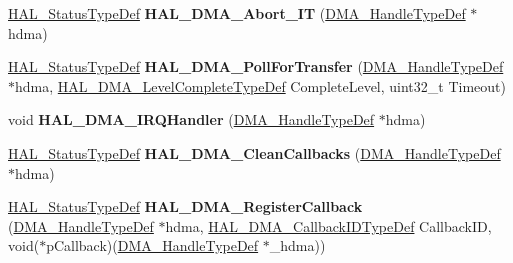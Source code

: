 \begin{DoxyCompactItemize}
\mbox{\label{group___d_m_a___exported___functions___group2_ga6677d7e614747341a58ffd7a048fd390}} 
\mbox{\hyperlink{stm32f4xx__hal__def_8h_a63c0679d1cb8b8c684fbb0632743478f}{H\+A\+L\+\_\+\+Status\+Type\+Def}} {\bfseries H\+A\+L\+\_\+\+D\+M\+A\+\_\+\+Abort\+\_\+\+IT} (\mbox{\hyperlink{group___d_m_a___exported___types_ga41b754a906b86bce54dc79938970138b}{D\+M\+A\+\_\+\+Handle\+Type\+Def}} $\ast$hdma)
\item 
\mbox{\label{group___d_m_a___exported___functions___group2_ga976a30472df973e3ad983f21289c9b5d}} 
\mbox{\hyperlink{stm32f4xx__hal__def_8h_a63c0679d1cb8b8c684fbb0632743478f}{H\+A\+L\+\_\+\+Status\+Type\+Def}} {\bfseries H\+A\+L\+\_\+\+D\+M\+A\+\_\+\+Poll\+For\+Transfer} (\mbox{\hyperlink{group___d_m_a___exported___types_ga41b754a906b86bce54dc79938970138b}{D\+M\+A\+\_\+\+Handle\+Type\+Def}} $\ast$hdma, \mbox{\hyperlink{group___d_m_a___exported___types_gaee3245eea8fa938edeb35a6c9596fd86}{H\+A\+L\+\_\+\+D\+M\+A\+\_\+\+Level\+Complete\+Type\+Def}} Complete\+Level, uint32\+\_\+t Timeout)
\item 
\mbox{\label{group___d_m_a___exported___functions___group2_ga8c8564d06f6d39b702af1c5cbb7dd54a}} 
void {\bfseries H\+A\+L\+\_\+\+D\+M\+A\+\_\+\+I\+R\+Q\+Handler} (\mbox{\hyperlink{group___d_m_a___exported___types_ga41b754a906b86bce54dc79938970138b}{D\+M\+A\+\_\+\+Handle\+Type\+Def}} $\ast$hdma)
\item 
\mbox{\label{group___d_m_a___exported___functions___group2_gaf511e4e6e0653fafdd9b40ce4a08b1db}} 
\mbox{\hyperlink{stm32f4xx__hal__def_8h_a63c0679d1cb8b8c684fbb0632743478f}{H\+A\+L\+\_\+\+Status\+Type\+Def}} {\bfseries H\+A\+L\+\_\+\+D\+M\+A\+\_\+\+Clean\+Callbacks} (\mbox{\hyperlink{group___d_m_a___exported___types_ga41b754a906b86bce54dc79938970138b}{D\+M\+A\+\_\+\+Handle\+Type\+Def}} $\ast$hdma)
\item 
\mbox{\label{group___d_m_a___exported___functions___group2_gaabec77de08a59c94f2c6265ce7ae8261}} 
\mbox{\hyperlink{stm32f4xx__hal__def_8h_a63c0679d1cb8b8c684fbb0632743478f}{H\+A\+L\+\_\+\+Status\+Type\+Def}} {\bfseries H\+A\+L\+\_\+\+D\+M\+A\+\_\+\+Register\+Callback} (\mbox{\hyperlink{group___d_m_a___exported___types_ga41b754a906b86bce54dc79938970138b}{D\+M\+A\+\_\+\+Handle\+Type\+Def}} $\ast$hdma, \mbox{\hyperlink{group___d_m_a___exported___types_gafbe8b2bd9ce2128de6cdc08ccde7e8ad}{H\+A\+L\+\_\+\+D\+M\+A\+\_\+\+Callback\+I\+D\+Type\+Def}} Callback\+ID, void($\ast$p\+Callback)(\mbox{\hyperlink{group___d_m_a___exported___types_ga41b754a906b86bce54dc79938970138b}{D\+M\+A\+\_\+\+Handle\+Type\+Def}} $\ast$\+\_\+hdma))

\end{DoxyCompactItemize}
